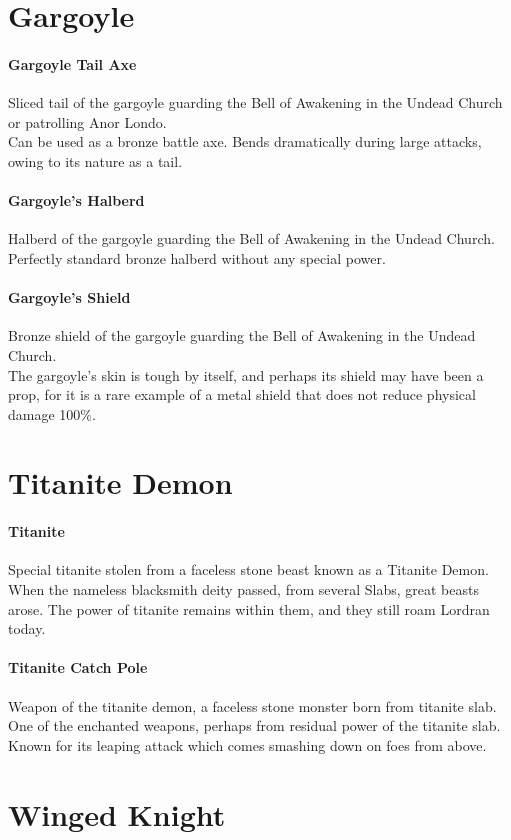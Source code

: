 \documentclass[twocolumn,a4paper]{article}
\begin{document}
\section*{Gargoyle}
\paragraph{Gargoyle Tail Axe}
Sliced tail of the gargoyle guarding the Bell of Awakening in the Undead Church or patrolling Anor Londo.\\
Can be used as a bronze battle axe. Bends dramatically during large attacks, owing to its nature as a tail.
\paragraph{Gargoyle's Halberd}
Halberd of the gargoyle guarding the Bell of Awakening in the Undead Church.\\
Perfectly standard bronze halberd without any special power.
\paragraph{Gargoyle's Shield}
Bronze shield of the gargoyle guarding the Bell of Awakening in the Undead Church.\\
The gargoyle's skin is tough by itself, and perhaps its shield may have been a prop, for it is a rare example of a metal shield that does not reduce physical damage 100\%.
\section*{Titanite Demon}
\paragraph{Titanite}
Special titanite stolen from a faceless stone beast known as a Titanite Demon.\\
When the nameless blacksmith deity passed, from several Slabs, great beasts arose. The power of titanite remains within them, and they still roam Lordran today.
\paragraph{Titanite Catch Pole}
Weapon of the titanite demon, a faceless stone monster born from titanite slab. One of the enchanted weapons, perhaps from residual power of the titanite slab. Known for its leaping attack which comes smashing down on foes from above.
\section*{Winged Knight}
\end{document}
